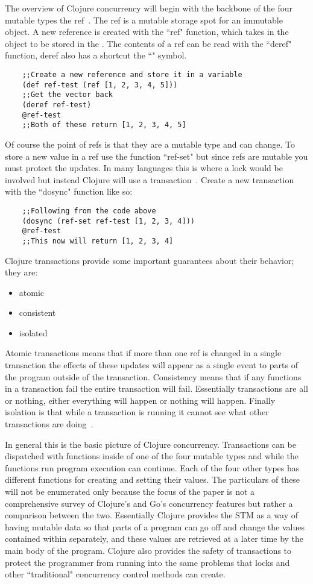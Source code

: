 \documentclass{acm_proc_article-sp}
\begin{document}
	The overview of Clojure concurrency will begin with the backbone of the four mutable types the ref~\cite{halloway}. The ref is a mutable storage spot for an immutable object. A new reference is created with the ``ref" function, which takes in the object to be stored in the . The contents of a ref can be read with the ``deref" function, deref also has a shortcut the ``\@" symbol.
	
	\begin{verbatim}
	;;Create a new reference and store it in a variable
	(def ref-test (ref [1, 2, 3, 4, 5]))
	;;Get the vector back
	(deref ref-test)
	@ref-test
	;;Both of these return [1, 2, 3, 4, 5]
	\end{verbatim}
	
	Of course the point of refs is that they are a mutable type and can change. To store a new value in a ref use the function ``ref-set" but since refs are mutable you must protect the updates. In many languages this is where a lock would be involved but instead Clojure will use a transaction~\cite{halloway}. Create a new transaction with the ``dosync" function like so:
	
	\begin{verbatim}
	;;Following from the code above
	(dosync (ref-set ref-test [1, 2, 3, 4]))
	@ref-test
	;;This now will return [1, 2, 3, 4]
	\end{verbatim}
	
	Clojure transactions provide some important guarantees about their behavior; they are:
	\begin{itemize}
	\item atomic
	\item consistent
	\item isolated
	\end{itemize}
	
	Atomic transactions means that if more than one ref is changed in a single transaction the effects of these updates will appear as a single event to parts of the program outside of the transaction. Consistency means that if any functions in a transaction fail the entire transaction will fail. Essentially transactions are all or nothing, either everything will happen or nothing will happen. Finally isolation is that while a transaction is running it cannot see what other transactions are doing~\cite{halloway}.
	
	In general this is the basic picture of Clojure concurrency. Transactions can be dispatched with functions inside of one of the four mutable types and while the functions run program execution can continue. Each of the four other types has different functions for creating and setting their values. The particulars of these will not be enumerated only because the focus of the paper is not a comprehensive survey of Clojure's and Go's concurrency features but rather a comparison between the two. Essentially Clojure provides the STM as a way of having mutable data so that parts of a program can go off and change the values contained within separately, and these values are retrieved at a later time by the main body of the program. Clojure also provides the safety of transactions to protect the programmer from running into the same problems that locks and other ``traditional" concurrency control methods can create.
	
\end{document}
